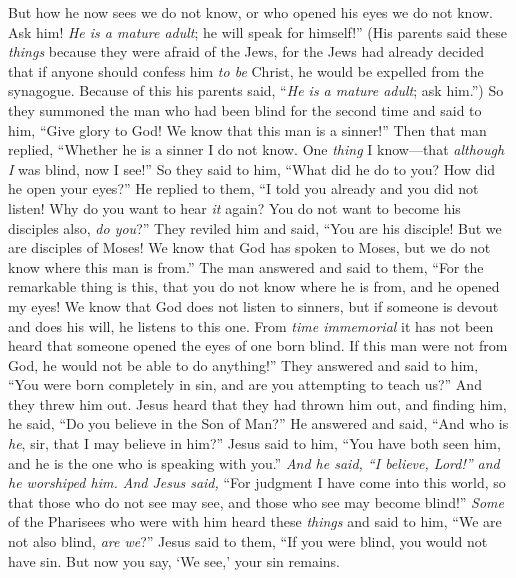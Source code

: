 \begin{biblechapter}
\verse But how he now sees we do not know, or who opened his eyes we do not know. Ask him! \textit{He is a mature adult}; he will speak for himself!”
\verse (His parents said these \textit{things} because they were afraid of the Jews, for the Jews had already decided that if anyone should confess him \textit{to be} Christ, he would be expelled from the synagogue.
\verse Because of this his parents said, “\textit{He is a mature adult}; ask him.”)
\verse So they summoned the man who had been blind for the second time and said to him, “Give glory to God! We know that this man is a sinner!”
\verse Then that man replied, “Whether he is a sinner I do not know. One \textit{thing} I know—that \textit{although I} was blind, now I see!”
\verse So they said to him, “What did he do to you? How did he open your eyes?”
\verse He replied to them, “I told you already and you did not listen! Why do you want to hear \textit{it} again? You do not want to become his disciples also, \textit{do you}?”
\verse They reviled him and said, “You are his disciple! But we are disciples of Moses!
\verse We know that God has spoken to Moses, but we do not know where this man is from.”
\verse The man answered and said to them, “For the remarkable thing is this, that you do not know where he is from, and he opened my eyes!
\verse We know that God does not listen to sinners, but if someone is devout and does his will, he listens to this one.
\verse From \textit{time immemorial} it has not been heard that someone opened the eyes of one born blind.
\verse If this man were not from God, he would not be able to do anything!”
\verse They answered and said to him, “You were born completely in sin, and are you attempting to teach us?” And they threw him out.
 Jesus heard that they had thrown him out, and finding him, he said, “Do you believe in the Son of Man?”
\verse He answered and said, “And who is \textit{he}, sir, that I may believe in him?”
\verse Jesus said to him, “You have both seen him, and he is the one who is speaking with you.”
\verse \textit{And he said, “I believe, Lord!” and he worshiped him.
\verse And Jesus said,} “For judgment I have come into this world, so that those who do not see may see, and those who see may become blind!”
\verse \textit{Some} of the Pharisees who were with him heard these \textit{things} and said to him, “We are not also blind, \textit{are we}?”
\verse Jesus said to them, “If you were blind, you would not have sin. But now you say, ‘We see,’ your sin remains.
\end{biblechapter}

